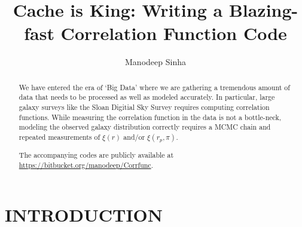 \documentclass[apj]{emulateapj}
\begin{document}
\title{Cache is King: Writing a Blazing-fast Correlation Function Code}

\author{Manodeep Sinha}

\begin{abstract}
We have entered the era of `Big Data' where we are gathering a tremendous amount of data that
needs to be processed as well as modeled accurately. In particular, large galaxy surveys
like the Sloan Digitial Sky Survey requires computing correlation functions. While measuring the
correlation function in the data is not a bottle-neck, modeling the observed galaxy distribution correctly
{\em} requires a MCMC chain and repeated measurements of $\xi(r)$ and/or $\xi(r_p,\pi)$. 

The accompanying codes are publicly available at \url{https://bitbucket.org/manodeep/Corrfunc}. 
\end{abstract}


\maketitle


\section{INTRODUCTION}

\setcounter{footnote}{0}

\section{}




\end{document}
